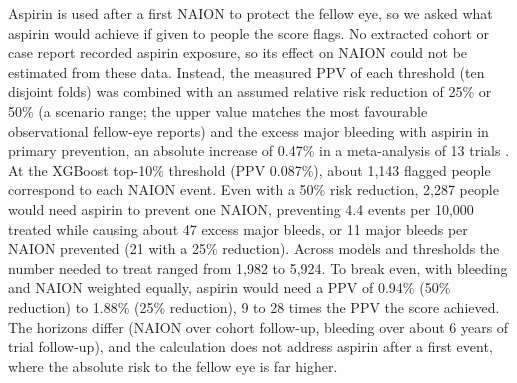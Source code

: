 \documentclass[journal]{IEEEtran}
\begin{document}
Aspirin is used after a first NAION to protect the fellow eye, so we
asked what aspirin would achieve if given to people the score flags. No
extracted cohort or case report recorded aspirin exposure, so its effect
on NAION could not be estimated from these data. Instead, the measured
PPV of each threshold (ten disjoint folds) was combined with an assumed
relative risk reduction of 25\% or 50\% (a scenario range; the upper
value matches the most favourable observational fellow-eye reports) and
the excess major bleeding with aspirin in primary prevention, an
absolute increase of 0.47\% in a meta-analysis of 13 trials
\cite{p30667501}. At the XGBoost top-10\% threshold (PPV 0.087\%),
about 1,143 flagged people correspond to each NAION event. Even with a
50\% risk reduction, 2,287 people would need aspirin to prevent one
NAION, preventing 4.4 events per 10,000 treated while causing about 47
excess major bleeds, or 11 major bleeds per NAION prevented (21 with a
25\% reduction). Across models and thresholds the number needed to treat
ranged from 1,982 to 5,924. To break even, with bleeding and NAION
weighted equally, aspirin would need a PPV of 0.94\% (50\% reduction) to
1.88\% (25\% reduction), 9 to 28 times the PPV the score achieved. The
horizons differ (NAION over cohort follow-up, bleeding over about 6
years of trial follow-up), and the calculation does not address aspirin
after a first event, where the absolute risk to the fellow eye is far
higher.
\end{document}
